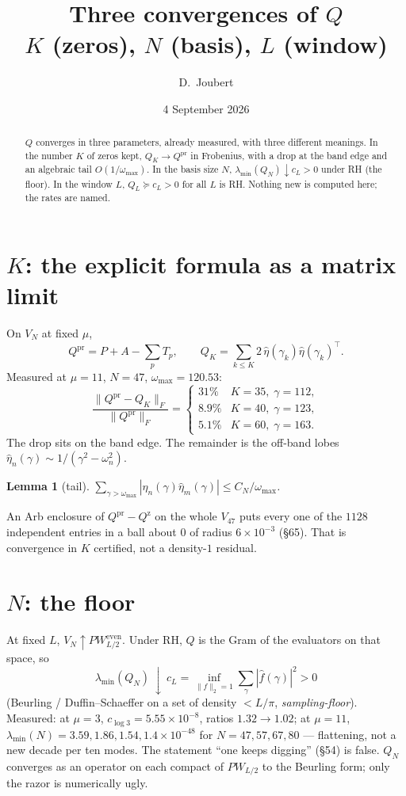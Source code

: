 \documentclass[11pt]{article}
\title{Three convergences of $Q$\\
\large $K$ (zeros), $N$ (basis), $L$ (window)}
\author{D.\ Joubert}
\date{4 September 2026}
\newtheorem{lemma}{Lemma}
\begin{document}
\maketitle
\begin{abstract}
\noindent
$Q$ converges in three parameters, already measured, with three
different meanings. In the number $K$ of zeros kept, $Q_K\to Q^{\mathrm{pr}}$
in Frobenius, with a drop at the band edge and an algebraic tail
$O(1/\omega_{\max})$. In the basis size $N$, $\lambda_{\min}(Q_N)\downarrow c_L>0$
under RH (the floor). In the window $L$, $Q_L\succeq c_L>0$ for all $L$
is RH. Nothing new is computed here; the rates are named.
\end{abstract}

\section{$K$: the explicit formula as a matrix limit}
On $V_N$ at fixed $\mu$,
\[
Q^{\mathrm{pr}}=P+A-\sum_p T_p,
\qquad
Q_K=\sum_{k\le K}2\,\hat\eta(\gamma_k)\hat\eta(\gamma_k)^{\!\top}.
\]
Measured at $\mu=11$, $N=47$, $\omega_{\max}=120.53$:
\[
\frac{\|Q^{\mathrm{pr}}-Q_K\|_F}{\|Q^{\mathrm{pr}}\|_F}
=
\begin{cases}
31\% & K=35,\;\gamma=112,\\
8.9\% & K=40,\;\gamma=123,\\
5.1\% & K=60,\;\gamma=163.
\end{cases}
\]
The drop sits on the band edge. The remainder is the off-band lobes
$\hat\eta_n(\gamma)\sim 1/(\gamma^2-\omega_n^2)$.
\begin{lemma}[tail]
$\sum_{\gamma>\omega_{\max}}|\hat\eta_n(\gamma)\hat\eta_m(\gamma)|
\le C_N/\omega_{\max}$.
\end{lemma}
An Arb enclosure of $Q^{\mathrm{pr}}-Q^{\mathrm{z}}$ on the whole
$V_{47}$ puts every one of the $1128$ independent entries in a ball
about $0$ of radius $6\times10^{-3}$ (\S65). That is convergence in
$K$ certified, not a density-$1$ residual.

\section{$N$: the floor}
At fixed $L$, $V_N\uparrow PW_{L/2}^{\mathrm{even}}$. Under RH,
$Q$ is the Gram of the evaluators on that space, so
\[
\lambda_{\min}(Q_N)\ \downarrow\ c_L=\inf_{\|f\|_2=1}\sum_{\gamma}|\hat f(\gamma)|^2>0
\]
(Beurling / Duffin--Schaeffer on a set of density $<L/\pi$,
\emph{sampling-floor}). Measured:
at $\mu=3$, $c_{\log3}=5.55\times10^{-8}$, ratios $1.32\to1.02$;
at $\mu=11$, $\lambda_{\min}(N)=3.59,1.86,1.54,1.4\times10^{-48}$ for
$N=47,57,67,80$ --- flattening, not a new decade per ten modes.
The statement ``one keeps digging'' (\S54) is false. $Q_N$ converges
as an operator on each compact of $PW_{L/2}$ to the Beurling form;
only the razor is numerically ugly.
\end{document}
